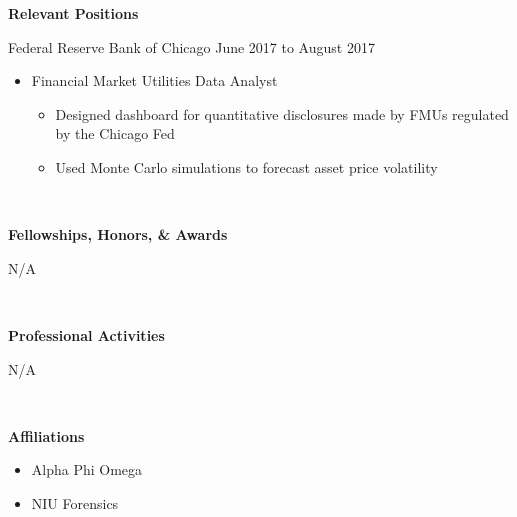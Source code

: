 \documentclass[final]{article}
\begin{document}
	\begin{minipage}[t]{.20\textwidth}
		\Large{\textbf{Relevant \mbox{Positions}}}\\
	\end{minipage}
	\begin{minipage}[t]{.80\textwidth}
		Federal Reserve Bank of Chicago \hfill June 2017 to August 2017
		\begin{itemize}
			\item Financial Market Utilities Data Analyst
			\begin{itemize}
				\item Designed dashboard for quantitative disclosures made by FMUs regulated by the Chicago Fed
				\item Used Monte Carlo simulations to forecast asset price volatility 
			\end{itemize} 
		\end{itemize}
	\end{minipage}\\

	\begin{minipage}[t]{.20\textwidth}
		\raggedright
		\Large{\textbf{Fellowships, Honors,  \& Awards }}\\
	\end{minipage}
	\begin{minipage}[t]{.80\textwidth}
		\hfil N/A\\
	\end{minipage}\\
	
	\begin{minipage}[t]{.20\textwidth}
		\Large{\textbf{Professional Activities}}\\
	\end{minipage}
	\begin{minipage}[t]{.80\textwidth}
		 N/A
	\end{minipage}\\

	\begin{minipage}[t]{.20\textwidth}
		\Large{\textbf{Affiliations}} \\
	\end{minipage}
	\begin{minipage}[t]{.80\textwidth}
		\begin{itemize}
			\item Alpha Phi Omega
			\item NIU Forensics
		\end{itemize}
	\end{minipage}\\
\end{document}
